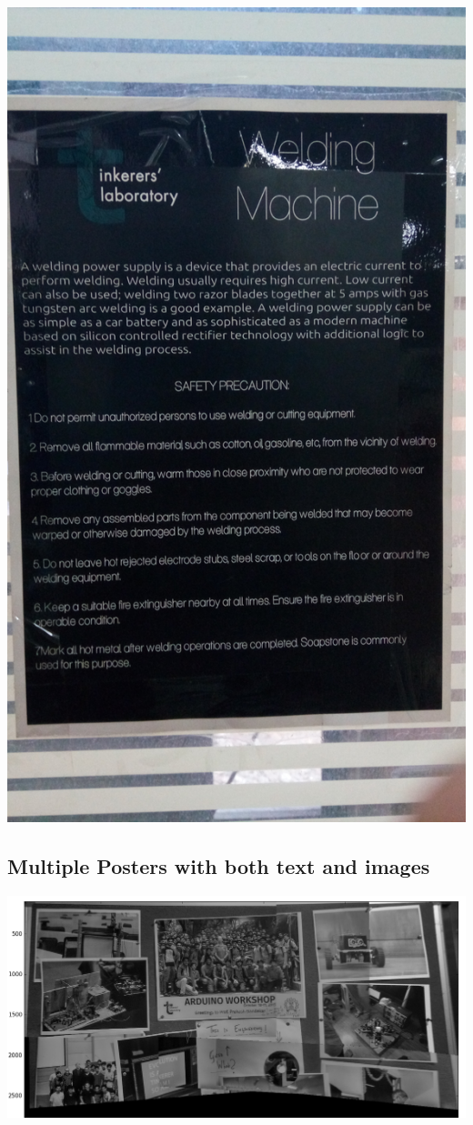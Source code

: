 \documentclass{article}
\begin{document}
\includegraphics[scale=0.05]{welding_machine/original}

\subsection*{Multiple Posters with both text and images}

\includegraphics[scale=0.25]{softboard/figure_1}
\end{document}
